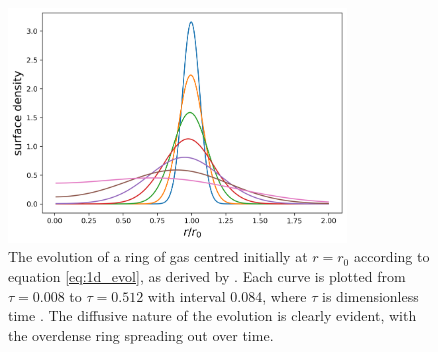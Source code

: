 \begin{figure}
    \centering
    \includegraphics[width = 0.8\textwidth]{figures/armitage_ringspread.png}
    \caption{The evolution of a ring of gas centred initially at $r=r_0$ according to equation \ref{eq:1d_evol}, as derived by \citet{lynden-bell1974}. Each curve is plotted from $\tau=0.008$ to $\tau=0.512$ with interval 0.084, where $\tau$ is dimensionless time \citep[figure from lecture notes by][]{armitage2022}. The diffusive nature of the evolution is clearly evident, with the overdense ring spreading out over time.}
    \label{fig:ring_spreading}
\end{figure}

